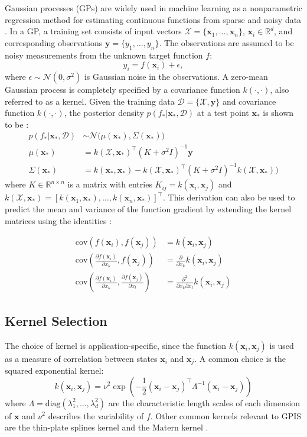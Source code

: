 \documentclass[letterpaper, 10 pt, conference]{ieeeconf}  %
\newcommand{\by}{\mathbf{y}}
\newcommand{\bx}{\mathbf{x}}
\newcommand{\mX}{\mathcal{X}}
\newcommand{\mD}{\mathcal{D}}
\newcommand{\mN}{\mathcal{N}}
\begin{document}
Gaussian processes (GPs) are widely used in machine learning as a nonparametric regression method for estimating continuous functions from sparse and noisy data \cite{rasmussen2006gaussian}.
In a GP, a training set consists of input vectors $\mX = \{\bx_1, \ldots, \bx_n\}$, $\bx_i \in \mathbb{R}^d$, and corresponding observations $\by = \{y_1, \ldots, y_n\}$. The observations are assumed to be noisy measurements from the unknown target function $f$:
\begin{equation}
y_i = f(\bx_i) + \epsilon,
\end{equation}
where $\epsilon \sim \mN(0,\sigma^2)$ is Gaussian noise in the observations.
A zero-mean Gaussian process is completely specified by a covariance function $k(\cdot,\cdot)$, also referred to as a kernel.
Given the training data $\mD = \{\mX, \by\}$ and covariance function $k(\cdot,\cdot)$, the posterior density $p(f_*|\bx_*,\mD)$ at a test point $\bx_{*}$ is shown to be \cite{rasmussen2006gaussian}:
\begin{align}
	p(f_*|\bx_*,\mD) &\sim \mN\big(\mu(\bx_*), \Sigma(\bx_*)\big) \label{eq:GPposterior} \\
	\mu(\bx_*) &= k(\mX,\bx_*)^{\intercal}(K + \sigma^2I)^{-1}\by \label{eq:GPmean} \\
	\Sigma(\bx_*) &= k(\bx_*,\bx_*)-k(\mX,\bx_*)^{\intercal}(K+\sigma^2I)^{-1}k(\mX,\bx_*)\big) \label{eq:GPvar}
\end{align}
where $K \in \mathbb{R}^{n \times n}$ is a matrix with entries $K_{ij} = k(\bx_i,\bx_j)$ and $k(\mX,\bx_*) = [k(\bx_1,\bx_*),\ldots,k(\bx_n,\bx_*)]^{\intercal}$. 
This derivation can also be used to predict the mean and variance of the function gradient by extending the kernel matrices using the identities \cite{solak2003derivative}:

\begin{align*}
	\text{cov}\left(f(\bx_i), f(\bx_j) \right) &=  k(\bx_i, \bx_j) \\
	\text{cov}\left(\frac{\partial f (\bx_i)}{\partial x_k}, f(\bx_j) \right) &= \frac{\partial}{\partial x_k} k(\bx_i, \bx_j) \\
	\text{cov}\left(\frac{\partial f (\bx_i)}{\partial x_k}, \frac{\partial f (\bx_j)}{\partial x_l} \right) &= \frac{\partial^2}{\partial x_k \partial x_l} k(\bx_i, \bx_j)
\end{align*}

\subsection{Kernel Selection}
The choice of kernel is application-specific, since the function $k(\bx_i,\bx_j)$ is used as a measure of correlation between states $\bx_i$ and $\bx_j$. A common choice is the squared exponential kernel:
\begin{equation}
	k(\bx_i,\bx_j) = \nu^2\exp(-\frac{1}{2}(\bx_i - \bx_j)^{\intercal}\Lambda^{-1}(\bx_i - \bx_j))
\end{equation}
where $\Lambda= \text{diag}(\lambda_1^2,\ldots,\lambda_d^2)$ are the characteristic length scales of each dimension of $\bx$ and $\nu^2$ describes the variability of $f$.
Other common kernels relevant to GPIS are the thin-plate splines kernel \cite{williams2007} and the Matern kernel \cite{bjorkman2013enhancing}.
\end{document}

